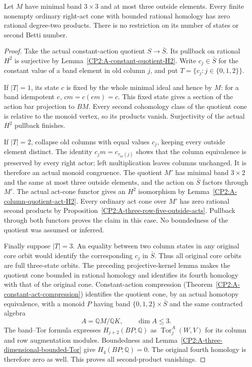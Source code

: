\begin{proposition}
\label{CP2:A-three-by-three-three-outside-bounded-acts}
Let $M$ have minimal band $3\times3$ and at most three outside
elements. Every finite nonempty ordinary right-act cone with
bounded rational homology has zero rational degree-two products.
There is no restriction on its number of states or second Betti number.
\end{proposition}
\begin{proof}
Take the actual constant-action quotient $S\to\bar S$.
Its pullback on rational $H^2$ is surjective by
Lemma~\ref{CP2:A-constant-quotient-H2}. Write $c_j\in\bar S$
for the constant value of a band element in old column $j$,
and put $T=\{c_j:j\in\{0,1,2\}\}$.

If $|T|=1$, its state $c$ is fixed by the whole minimal ideal
and hence by $M$: for a band idempotent $e$,
$cm=c(em)=c$. This fixed state gives a section of the action
bar projection to $BM$. Every second cohomology class of the
quotient cone is relative to the monoid vertex, so its products
vanish. Surjectivity of the actual $H^2$ pullback finishes.

If $|T|=2$, collapse old columns with equal values $c_j$,
keeping every outside element distinct. The identity
$c_jm=c_{\tau_m(j)}$ shows that the column equivalence is
preserved by every right actor; left multiplication leaves
columns unchanged. It is therefore an actual monoid congruence.
The quotient $M'$ has minimal band $3\times2$ and the same
at most three outside elements, and the action on $\bar S$
factors through $M'$. The actual act-cone functor gives an
$H^2$ isomorphism by Lemma~\ref{CP2:A-column-quotient-act-H2}.
Every ordinary act cone over $M'$ has zero rational second
products by Proposition~\ref{CP2:A-three-row-five-outside-acts}.
Pullback through both functors proves the claim in this case.
No boundedness of the quotient was assumed or inferred.

Finally suppose $|T|=3$. An equality between two column states
in any original core orbit would identify the corresponding
$c_j$ in $\bar S$. Thus all original core orbits are full
three-state orbits. The preceding projective-kernel lemma
makes the quotient cone bounded in rational homology and
identifies its fourth homology with that of the original cone.
Constant-action compression
(Theorem~\ref{CP2:A-constant-act-compression}) identifies the
quotient cone, by an actual homotopy equivalence, with a monoid
$P$ having band $\{0,1,2\}\times\bar S$ and the same contracted
algebra
\[
 A=\mathbb QM/\mathbb QK,\qquad \dim A\leq3.
\]
The band--Tor formula expresses $H_{j+2}(BP;\mathbb Q)$ as
$\operatorname{Tor}^A_j(W,V)$ for its column and row augmentation
modules. Boundedness and Lemma~\ref{CP2:A-three-dimensional-bounded-Tor}
give $H_4(BP;\mathbb Q)=0$. The original fourth homology is
therefore zero as well. This proves all second-product vanishings.
\end{proof}

